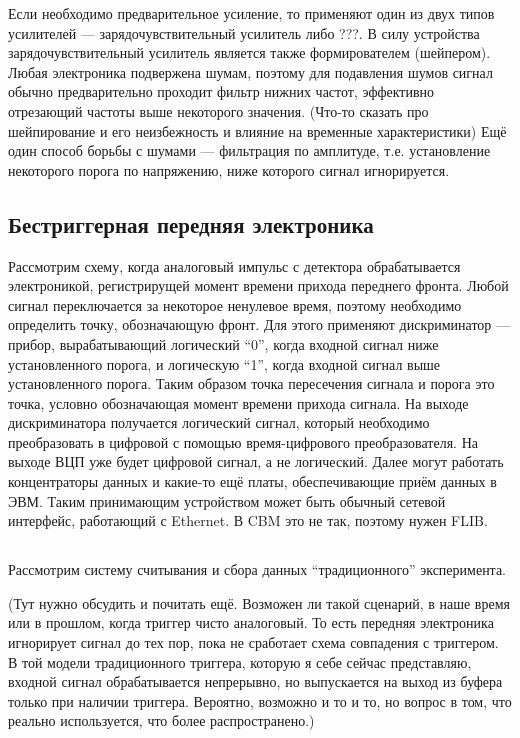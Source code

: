 Если необходимо предварительное усиление, то применяют один из двух типов усилителей --- зарядочувствительный усилитель либо ???. В силу устройства зарядочувствительный усилитель является также формирователем (шейпером).
Любая электроника подвержена шумам, поэтому для подавления шумов сигнал обычно предварительно проходит фильтр нижних частот, эффективно отрезающий частоты выше некоторого значения. (Что-то сказать про шейпирование и его неизбежность и влияние на временные характеристики) Ещё один способ борьбы с шумами --- фильтрация по амплитуде, т.е. установление некоторого порога по напряжению, ниже которого сигнал игнорируется.

\subsection{Бестриггерная передняя электроника}

Рассмотрим схему, когда аналоговый импульс с детектора обрабатывается электроникой, регистрирущей момент времени прихода переднего фронта. Любой сигнал переключается за некоторое ненулевое время, поэтому необходимо определить точку, обозначающую фронт. Для этого применяют дискриминатор --- прибор, вырабатывающий логический ``0'', когда входной сигнал ниже установленного порога, и логическую ``1'', когда входной сигнал выше установленного порога. Таким образом точка пересечения сигнала и порога это точка, условно обозначающая момент времени прихода сигнала. На выходе дискриминатора получается логический сигнал, который необходимо преобразовать в цифровой с помощью время-цифрового преобразователя. На выходе ВЦП уже будет цифровой сигнал, а не логический. Далее могут работать концентраторы данных и какие-то ещё платы, обеспечивающие приём данных в ЭВМ. Таким принимающим устройством может быть обычный сетевой интерфейс, работающий с Ethernet. В CBM это не так, поэтому нужен FLIB.

\subsection{}

Рассмотрим систему считывания и сбора данных ``традиционного'' эксперимента.

(Тут нужно обсудить и почитать ещё. Возможен ли такой сценарий, в наше время или в прошлом, когда триггер чисто аналоговый. То есть передняя электроника игнорирует сигнал до тех пор, пока не сработает схема совпадения с триггером. В той модели традиционного триггера, которую я себе сейчас представляю, входной сигнал обрабатывается непрерывно, но выпускается на выход из буфера только при наличии триггера. Вероятно, возможно и то и то, но вопрос в том, что реально используется, что более распространено.)

